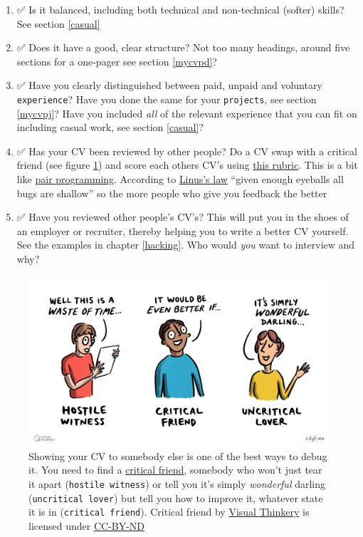\documentclass[
]{book}
\begin{document}
\begin{enumerate}
\item
  ✅ Is it balanced, including both technical and non-technical (softer) skills? See section \ref{casual}
\item
  ✅ Does it have a good, clear structure? Not too many headings, around five sections for a one-pager see section \ref{mycvpd}?
\item
  ✅ Have you clearly distinguished between paid, unpaid and voluntary \texttt{experience}? Have you done the same for your \texttt{projects}, see section \ref{mycvpj}? Have you included \emph{all} of the relevant experience that you can fit on including casual work, see section \ref{casual}?
\item
  ✅ Has your CV been reviewed by other people? Do a CV swap with a critical friend (see figure \ref{fig:wonderfuldarling-fig}) and score each others CV's using \href{https://www.cdyf.me/CV-rubric.pdf}{this rubric}. This is a bit like \href{https://en.wikipedia.org/wiki/Pair_programming}{pair programming}. According to \href{https://en.wikipedia.org/wiki/Linus\%27s_law}{Linus's law} ``given enough eyeballs all bugs are shallow'' \citep{Raymond1999} so the more people who give you feedback the better
\item
  ✅ Have you reviewed other people's CV's? This will put you in the shoes of an employer or recruiter, thereby helping you to write a better CV yourself. See the examples in chapter \ref{hacking}. Who would \emph{you} want to interview and why?
\end{enumerate}

\begin{figure}

{\centering \includegraphics[width=1\linewidth]{images/Critical Friend} 

}

\caption{Showing your CV to somebody else is one of the best ways to debug it. You need to find a \href{https://en.wikipedia.org/wiki/Critical_friend}{critical friend}, somebody who won't just tear it apart (\texttt{hostile\ witness}) or tell you it's simply \emph{wonderful} darling (\texttt{uncritical\ lover}) but tell you how to improve it, whatever state it is in (\texttt{critical\ friend}). Critical friend by \href{https://visualthinkery.com/}{Visual Thinkery} is licensed under \href{https://creativecommons.org/licenses/by-nd/4.0/}{CC-BY-ND}}\label{fig:wonderfuldarling-fig}
\end{figure}
\end{document}
